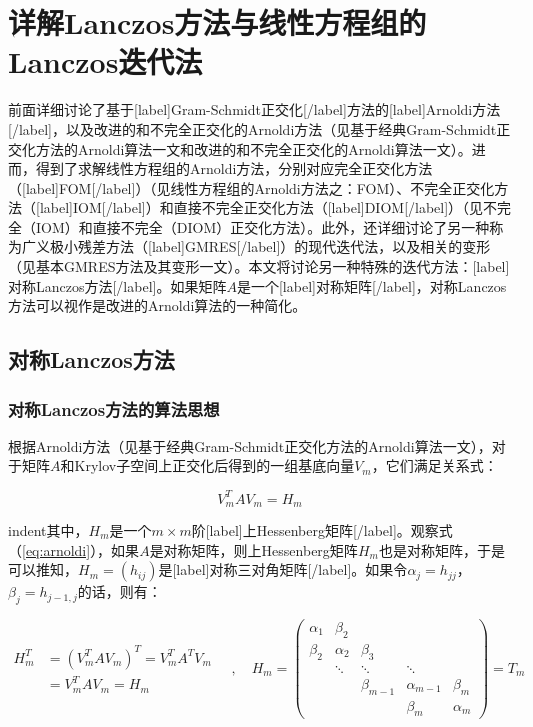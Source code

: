 \documentclass[UTF8,nofonts]{ctexart}
\begin{document}

\section*{详解Lanczos方法与线性方程组的Lanczos迭代法}


前面详细讨论了基于[label]Gram-Schmidt正交化[/label]方法的[label]Arnoldi方法[/label]，以及改进的和不完全正交化的Arnoldi方法（见基于经典Gram-Schmidt正交化方法的Arnoldi算法一文和改进的和不完全正交化的Arnoldi算法一文）。进而，得到了求解线性方程组的Arnoldi方法，分别对应完全正交化方法（[label]FOM[/label]）（见线性方程组的Arnoldi方法之：FOM）、不完全正交化方法（[label]IOM[/label]）和直接不完全正交化方法（[label]DIOM[/label]）（见不完全（IOM）和直接不完全（DIOM）正交化方法）。此外，还详细讨论了另一种称为广义极小残差方法（[label]GMRES[/label]）的现代迭代法，以及相关的变形（见基本GMRES方法及其变形一文）。本文将讨论另一种特殊的迭代方法：[label]对称Lanczos方法[/label]。如果矩阵$A$是一个[label]对称矩阵[/label]，对称Lanczos方法可以视作是改进的Arnoldi算法的一种简化。

\subsection*{对称Lanczos方法}

\subsubsection*{对称Lanczos方法的算法思想}

根据Arnoldi方法（见基于经典Gram-Schmidt正交化方法的Arnoldi算法一文），对于矩阵$A$和Krylov子空间上正交化后得到的一组基底向量$V_m$，它们满足关系式：

\begin{equation}
\label{eq:arnoldi}
V^T_mAV_m=H_m
\end{equation}

indent其中，$H_m$是一个$m \times m$阶[label]上Hessenberg矩阵[/label]。观察式（\ref{eq:arnoldi}），如果$A$是对称矩阵，则上Hessenberg矩阵$H_m$也是对称矩阵，于是可以推知，$H_{m}=(h_{ij})$是[label]对称三对角矩阵[/label]。如果令$\alpha_j=h_{jj}$，$\beta_j=h_{j-1,j}$的话，则有：

\begin{equation}
\label{eq:tm}
\begin{aligned}
H_m^T&=(V_m^TAV_m)^T=V_m^TA^TV_m \\
&=V_m^TAV_m=H_m
\end{aligned}\quad,\quad
H_m=\begin{pmatrix}
\alpha_1 & \beta_2 & & & \\
\beta_2 & \alpha_2 & \beta_3 & & \\
& \ddots & \ddots & \ddots & \\
& & \beta_{m-1} & \alpha_{m-1} & \beta_m \\
& & & \beta_m & \alpha_m
\end{pmatrix}=T_m
\end{equation}
\end{document}
